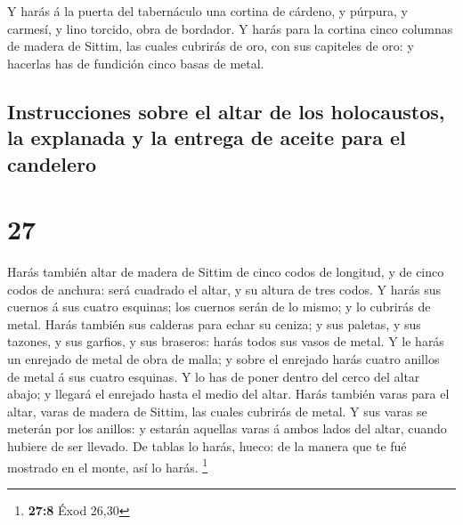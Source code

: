  Y harás á la puerta del tabernáculo una cortina de
cárdeno, y púrpura, y carmesí, y lino torcido, obra de bordador.
 Y harás para la cortina cinco columnas de madera de
Sittim, las cuales cubrirás de oro, con sus capiteles de oro: y hacerlas
has de fundición cinco basas de metal.

\hypertarget{instrucciones-sobre-el-altar-de-los-holocaustos-la-explanada-y-la-entrega-de-aceite-para-el-candelero}{%
\subsection{Instrucciones sobre el altar de los holocaustos, la
explanada y la entrega de aceite para el
candelero}\label{instrucciones-sobre-el-altar-de-los-holocaustos-la-explanada-y-la-entrega-de-aceite-para-el-candelero}}

\hypertarget{section-26}{%
\section{27}\label{section-26}}

 Harás también altar de madera de Sittim de cinco codos de
longitud, y de cinco codos de anchura: será cuadrado el altar, y su
altura de tres codos.  Y harás sus cuernos á sus cuatro
esquinas; los cuernos serán de lo mismo; y lo cubrirás de metal.
 Harás también sus calderas para echar su ceniza; y sus
paletas, y sus tazones, y sus garfios, y sus braseros: harás todos sus
vasos de metal.  Y le harás un enrejado de metal de obra de
malla; y sobre el enrejado harás cuatro anillos de metal á sus cuatro
esquinas.  Y lo has de poner dentro del cerco del altar
abajo; y llegará el enrejado hasta el medio del altar. 
Harás también varas para el altar, varas de madera de Sittim, las cuales
cubrirás de metal.  Y sus varas se meterán por los anillos:
y estarán aquellas varas á ambos lados del altar, cuando hubiere de ser
llevado.  De tablas lo harás, hueco: de la manera que te fué
mostrado en el monte, así lo harás. \footnote{\textbf{27:8} Éxod 26,30}

